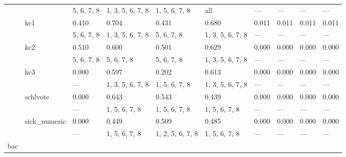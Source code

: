 \documentclass{article}
\begin{document}
\begin{center}
\begin{longtable}{p{1.2cm}p{1.8cm}p{1cm}p{1cm}p{1cm}p{1cm}p{1cm}p{1cm}p{1cm}p{1cm}}
             &              & 5, 6, 7, 8       & 1, 3, 5, 6, 7, 8 & 1, 5, 6, 7, 8    & all              & ---              & ---              & ---              & ---              \\
             & kc1          & 0.410            & 0.704            & 0.431            & 0.680            & 0.011            & 0.011            & 0.011            & 0.011            \\
             &              & 5, 6, 7, 8       & 1, 3, 5, 6, 7, 8 & 5, 6, 7, 8       & 1, 3, 5, 6, 7, 8 & ---              & ---              & ---              & ---              \\
             & kc2          & 0.510            & 0.600            & 0.501            & 0.629            & 0.000            & 0.000            & 0.000            & 0.000            \\
             &              & 5, 6, 7, 8       & 5, 6, 7, 8       & 5, 6, 7, 8       & 1, 3, 5, 6, 7, 8 & ---              & ---              & ---              & ---              \\
             & kc3          & 0.000            & 0.597            & 0.202            & 0.613            & 0.000            & 0.000            & 0.000            & 0.000            \\
             &              & ---              & 1, 3, 5, 6, 7, 8 & 1, 5, 6, 7, 8    & 1, 3, 5, 6, 7, 8 & ---              & ---              & ---              & ---              \\
             & schlvote     & 0.000            & 0.643            & 0.543            & 0.439            & 0.000            & 0.000            & 0.000            & 0.000            \\
             &              & ---              & 1, 5, 6, 7, 8    & 1, 5, 6, 7, 8    & 1, 5, 6, 7, 8    & ---              & ---              & ---              & ---              \\
             & sick\_numeric & 0.000            & 0.449            & 0.509            & 0.485            & 0.000            & 0.000            & 0.000            & 0.000            \\
             &              & ---              & 1, 5, 6, 7, 8    & 1, 2, 5, 6, 7, 8 & 1, 5, 6, 7, 8    & ---              & ---              & ---              & ---              \\
 bac         &              &                  &                  &                  &                  &                  &                  &                  &                  \\

\end{longtable}
\end{center}
\end{document}
